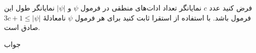 فرض کنید عدد $c$ نمایانگر تعداد ادات‌های منطقی در فرمول $\psi$ و $|\psi|$ نمایانگر طول این فرمول باشد. با استفاده از استقرا ثابت کنید برای هر فرمول $\psi$ نامعادلهٔ
$3c+1\leq|\psi|$ صادق است.
\begin{ans}
جواب
\end{ans}

